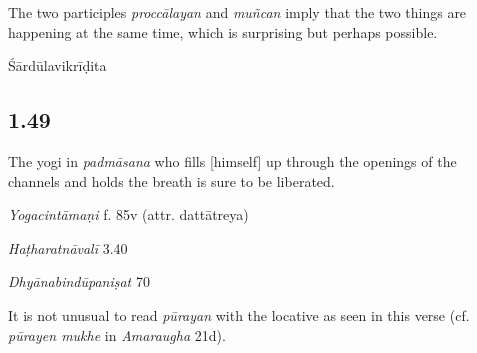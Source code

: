 \begin{ekdosis}
\begin{philcomm}[hp01_048]
The two participles \emph{proccālayan} and \emph{muñcan} imply that the two things are happening at the same time, which is surprising but perhaps possible.

\end{philcomm}

\begin{metre}[hp01_048]
Śārdūlavikrīḍita 
\end{metre}

\subsection*{1.49}
\begin{translation}[hp01_049]
The yogi in \emph{padmāsana} who fills [himself] up through the openings of the channels and holds the breath is sure to be liberated.
\end{translation}


\begin{testimonia}[hp01_049]
\emph{Yogacintāmaṇi} f. 85v (attr. dattātreya)

\begin{versinnote}
\end{versinnote}

\emph{Haṭharatnāvalī} 3.40

\begin{versinnote}
\end{versinnote}

\emph{Dhyānabindūpaniṣat} 70

\begin{versinnote}
\end{versinnote}

\end{testimonia}

\begin{philcomm}[hp01_049]
It is not unusual to read \emph{pūrayan} with the locative as seen in this verse (cf. \emph{pūrayen mukhe} in \emph{Amaraugha} 21d). 


\end{philcomm}
\end{ekdosis}
